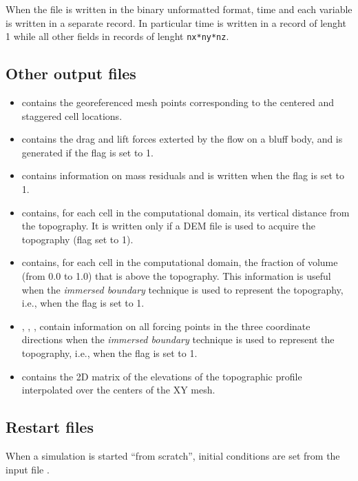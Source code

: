 When the file is written in the binary unformatted format,
time and each variable is written in a separate record.
In particular time is written in a record of lenght 1
while all other fields in records of lenght {\tt nx*ny*nz}.

\subsection{Other output files}
\begin{itemize}
\item {} contains the georeferenced mesh points
corresponding to the centered and staggered cell locations.
\item {} contains the drag and
lift forces exterted by the flow on a bluff body, and is generated 
if the flag  is set to 1.
\item {} contains information on mass residuals and is written when
the flag  is set to 1.
\item {} contains, for each cell in the computational
domain, its vertical distance from the topography. It is written
only if a DEM file is used to acquire the topography (flag  set
to 1).
\item {} contains, for each cell in the computational domain,
the fraction of volume (from 0.0 to 1.0) that is above the topography.
This information is useful when the {\em immersed boundary} technique is
used to represent the topography, i.e., when the flag  is set to 1. 
\item {}, , , contain information on
all forcing points in the three coordinate directions when the 
{\em immersed boundary} technique is used to represent the topography, 
i.e., when the flag  is set to 1.
\item {} contains the 2D matrix of the elevations
of the topographic profile interpolated over the centers of the XY mesh.
\end{itemize}

\subsection{Restart files}

When a simulation is started ``from scratch'', 
initial conditions are set from the input file .\\

